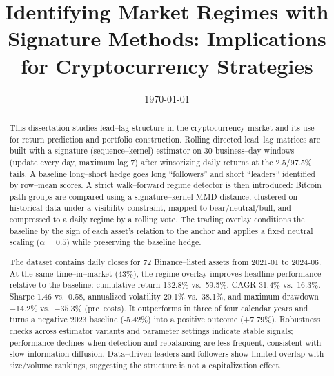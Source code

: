 \documentclass{ecsthesis}      %
\begin{document}
\frontmatter
\title      {Identifying Market Regimes with Signature Methods: Implications for Cryptocurrency Strategies}

\date       {\today}
\examiner {}

\subject    {Mathemetics}
\keywords   {}
\maketitle
\begin{abstract}

This dissertation studies lead--lag structure in the cryptocurrency market and its use for return prediction and portfolio construction. Rolling directed lead--lag matrices are built with a signature (sequence–kernel) estimator on 30 business–day windows (update every day, maximum lag 7) after winsorizing daily returns at the 2.5/97.5\% tails. A baseline long–short hedge goes long “followers” and short “leaders” identified by row–mean scores. A strict walk–forward regime detector is then introduced: Bitcoin path groups are compared using a signature–kernel MMD distance, clustered on historical data under a visibility constraint, mapped to bear/neutral/bull, and compressed to a daily regime by a rolling vote. The trading overlay conditions the baseline by the sign of each asset’s relation to the anchor and applies a fixed neutral scaling ($\alpha=0.5$) while preserving the baseline hedge.

The dataset contains daily closes for 72 Binance–listed assets from 2021-01 to 2024-06. At the same time–in–market (43\%), the regime overlay improves headline performance relative to the baseline: cumulative return 132.8\% vs.\ 59.5\%, CAGR 31.4\% vs.\ 16.3\%, Sharpe 1.46 vs.\ 0.58, annualized volatility 20.1\% vs.\ 38.1\%, and maximum drawdown $-14.2\%$ vs.\ $-35.3\%$ (pre–costs). It outperforms in three of four calendar years and turns a negative 2023 baseline (-5.42\%) into a positive outcome (+7.79\%). Robustness checks across estimator variants and parameter settings indicate stable signals; performance declines when detection and rebalancing are less frequent, consistent with slow information diffusion. Data–driven leaders and followers show limited overlap with size/volume rankings, suggesting the structure is not a capitalization effect.


\end{abstract}
\end{document}
